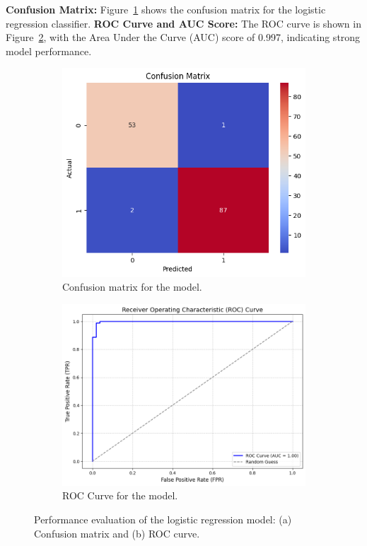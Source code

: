 \documentclass[12pt]{article}
\begin{document}
\textbf{Confusion Matrix:} Figure~\ref{fig:confusion_matrix_lr} shows the confusion matrix for the logistic regression classifier.
\textbf{ROC Curve and AUC Score:} The ROC curve is shown in Figure~\ref{fig:roc_curve_lr}, with the Area Under the Curve (AUC) score of 0.997, indicating strong model performance.
\begin{figure}[H]
    \centering
    \begin{subfigure}[b]{0.4\textwidth}
        \centering
        \includegraphics[width=\textwidth]{assets/lr/lr-cm.png}
        \caption{Confusion matrix for the model.}
        \label{fig:confusion_matrix_lr}
    \end{subfigure}
    \hfill
    \begin{subfigure}[b]{0.4\textwidth}
        \centering
        \includegraphics[width=\textwidth]{assets/lr/lr-roc.png}
        \caption{ROC Curve for the model.}
        \label{fig:roc_curve_lr}
    \end{subfigure}
    \caption{Performance evaluation of the logistic regression model: (a) Confusion matrix and (b) ROC curve.}
    \label{fig:lr_side_by_side}
\end{figure}
\vspace{-15pt} %
\end{document}
